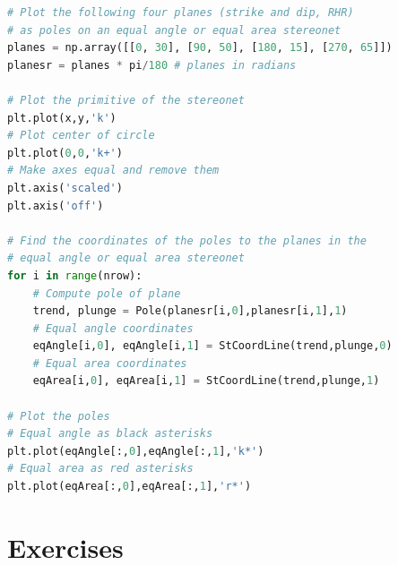 \documentclass[a4paper , 12pt]{book}
\begin{document}
\begin{center}
\begin{lstlisting}[language=Python, frame=single]
# Plot the following four planes (strike and dip, RHR)
# as poles on an equal angle or equal area stereonet
planes = np.array([[0, 30], [90, 50], [180, 15], [270, 65]])
planesr = planes * pi/180 # planes in radians

# Plot the primitive of the stereonet
plt.plot(x,y,'k')
# Plot center of circle
plt.plot(0,0,'k+')
# Make axes equal and remove them
plt.axis('scaled')
plt.axis('off')

# Find the coordinates of the poles to the planes in the
# equal angle or equal area stereonet
for i in range(nrow):
    # Compute pole of plane
    trend, plunge = Pole(planesr[i,0],planesr[i,1],1)
    # Equal angle coordinates
    eqAngle[i,0], eqAngle[i,1] = StCoordLine(trend,plunge,0) 
    # Equal area coordinates
    eqArea[i,0], eqArea[i,1] = StCoordLine(trend,plunge,1)

# Plot the poles
# Equal angle as black asterisks
plt.plot(eqAngle[:,0],eqAngle[:,1],'k*')
# Equal area as red asterisks
plt.plot(eqArea[:,0],eqArea[:,1],'r*')
\end{lstlisting}
\end{center}

\section{Exercises} \label{exercises3}
\end{document}

